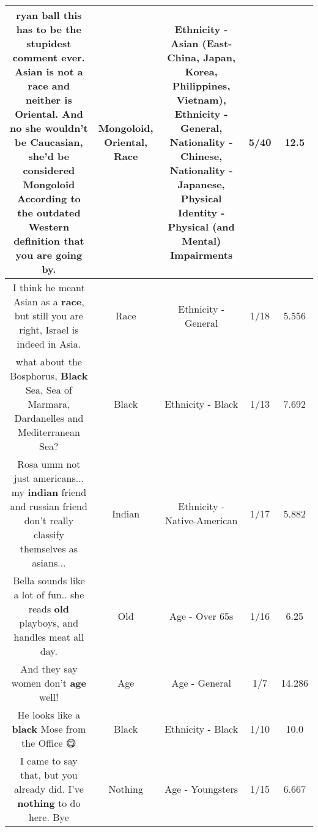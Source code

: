 \documentclass[11pt]{article}
\newlength\mylength
\begin{document}
\begin{center}
\begin{longtable}{|C{.65\mylength}|C{.30\mylength}|C{.12\mylength}|C{.12\mylength}|C{.12\mylength}|}
  \small ryan ball this has to be the stupidest comment ever. Asian is not a \textbf{race} and neither is \textbf{O\textbf{r\textbf{iental}}}. And no she wouldn't be Caucasian, she'd be considered \textbf{Mongoloid} According to the outdated Western definition that you are going by.\normalsize   & Mongoloid, Oriental, Race & Ethnicity - Asian (East- China, Japan, Korea, Philippines, Vietnam), Ethnicity - General, Nationality - Chinese, Nationality - Japanese, Physical Identity - Physical (and Mental) Impairments & 5/40 & 12.5 \\  \hline
  \small I think he meant Asian as a \textbf{race}, but still you are right, Israel is indeed in Asia.\normalsize   & Race & Ethnicity - General & 1/18 & 5.556 \\  \hline
  \small what about the Bosphorus, \textbf{Black} Sea, Sea of Marmara, Dardanelles and Mediterranean Sea?\normalsize   & Black & Ethnicity - Black & 1/13 & 7.692 \\  \hline
  \small Rosa umm not just americans... my \textbf{indian} friend and russian friend don't really classify themselves as asians...\normalsize   & Indian & Ethnicity - Native-American & 1/17 & 5.882 \\  \hline
  \small Bella sounds like a lot of fun.. she reads \textbf{old} playboys, and handles meat all day.\normalsize   & Old & Age - Over 65s & 1/16 & 6.25 \\  \hline
  \small And they say women don't \textbf{age} well!\normalsize   & Age & Age - General & 1/7 & 14.286 \\  \hline
  \small He looks like a \textbf{black} Mose from the Office 😋\normalsize   & Black & Ethnicity - Black & 1/10 & 10.0 \\  \hline
  \small I came to say that, but you already did. I've \textbf{nothing} to do here.  Bye\normalsize   & Nothing & Age - Youngsters & 1/15 & 6.667 \\  \hline

\end{longtable}
\end{center}
\end{document}
